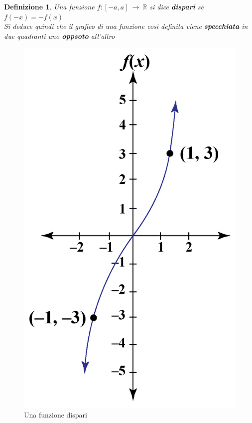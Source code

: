 \documentclass[12pt, a4paper]{article}
\theoremstyle{break}
\newtheorem{defn}{Definizione}
\theoremstyle{lemma}
\theoremstyle{lemma}
\theoremstyle{lemma}
\begin{document}
\begin{defn}
Una funzione $f: [-a, a]\ \rightarrow \ \mathbb{R}$ si dice \textbf{dispari} se $f(-x) = -f(x)$\\
Si deduce quindi che il grafico di una funzione così definita viene \textbf{specchiata} in due quadranti uno \textbf{oppsoto} all'altro
\end{defn}

\begin{figure}[ht]
  \center
  \includegraphics[scale=0.25]{funzionedispari}
  \caption{Una funzione dispari}
  \label{fig:funzione_dispari_grafico}
\end{figure}
\end{document}

